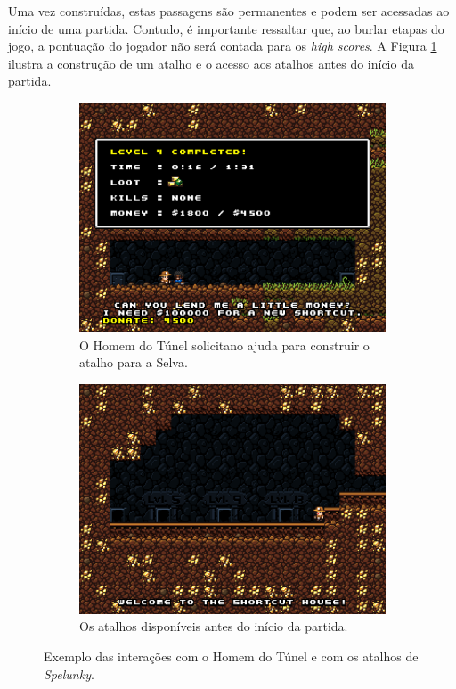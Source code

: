 Uma vez construídas, estas passagens são permanentes e podem ser acessadas ao
início de uma partida. Contudo, é importante ressaltar que, ao burlar etapas do
jogo, a pontuação do jogador não será contada para os \textit{high scores}. A
Figura \ref{fig:spelunky-tunnelman} ilustra a construção de um atalho e o acesso
aos atalhos antes do início da partida.

\begin{figure}[htb!]
\centering
	\begin{subfigure}[b]{0.4\textwidth}
		\includegraphics[width=\textwidth]{fig/spelunky-tunnelman.png}
		\caption{O Homem do Túnel solicitano ajuda para construir o atalho para
		a Selva.}
		\label{fig:spelunky-tunnelman}
	\end{subfigure}
	\begin{subfigure}[b]{0.4\textwidth}
		\includegraphics[width=\textwidth]{fig/spelunky-shortcuts.png}
		\caption{Os atalhos disponíveis antes do início da partida.}
		\label{fig:spelunky-shortcuts}
	\end{subfigure}
	\caption{Exemplo das interações com o Homem do Túnel e com os atalhos de
	\textit{Spelunky}.}
	\label{fig:spelunky-shortcuts-example}
\end{figure}



